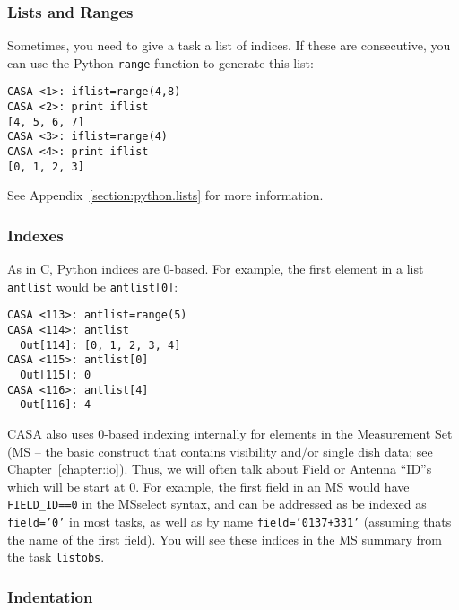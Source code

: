 \subsubsection{Lists and Ranges}
\label{section:intro.basics.python.lists}

Sometimes, you need to give a task a list of indices.  If these
are consecutive, you can use the Python {\tt range} function to 
generate this list:
\small
\begin{verbatim}
CASA <1>: iflist=range(4,8)
CASA <2>: print iflist
[4, 5, 6, 7]
CASA <3>: iflist=range(4)
CASA <4>: print iflist
[0, 1, 2, 3]
\end{verbatim}
\normalsize

See Appendix~\ref{section:python.lists} for more information.

\subsubsection{Indexes}
\label{section:intro.basics.python.index}

As in C, Python indices are 0-based.  For example, the first
element in a list {\tt antlist} would be {\tt antlist[0]}:
\small
\begin{verbatim}
CASA <113>: antlist=range(5)
CASA <114>: antlist
  Out[114]: [0, 1, 2, 3, 4]
CASA <115>: antlist[0]
  Out[115]: 0
CASA <116>: antlist[4]
  Out[116]: 4
\end{verbatim}
\normalsize

CASA also uses 0-based indexing internally for elements in the Measurement
Set (MS -- the basic construct that contains visibility and/or single dish
data; see Chapter~\ref{chapter:io}).
Thus, we will often talk about Field or Antenna ``ID''s
which will be start at 0.  For example, the first field in an MS
would have {\tt FIELD\_ID==0} in the MSselect syntax, and can
be addressed as be indexed as {\tt field='0'} in most tasks, as
well as by name {\tt field='0137+331'} (assuming thats the name
of the first field).  You will see these indices in the MS summary
from the task {\tt listobs}. 

\subsubsection{Indentation}
\label{section:intro.basics.python.indent}

